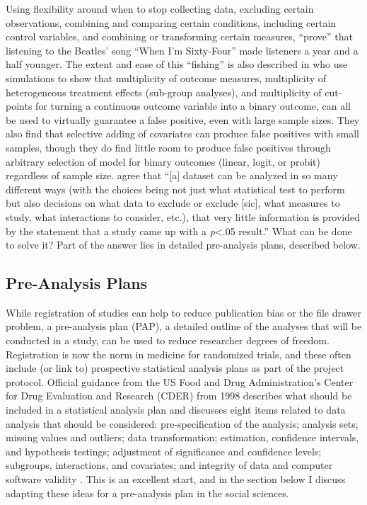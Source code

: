 \documentclass[12pt] {article}
\begin{document}
Using flexibility around when to stop
collecting data, excluding certain observations, combining and comparing
certain conditions, including certain control variables, and combining
or transforming certain measures, \cite{simmons_false-positive_2011} ``prove'' that listening to the
Beatles' song ``When I'm Sixty-Four'' made listeners a year and a half
younger. The extent and ease of this ``fishing'' is also described in
\cite{humphreys_fishing_2013} who use simulations to show that multiplicity of outcome measures, multiplicity of heterogeneous treatment effects (sub-group analyses), and multiplicity of cut-points for turning a continuous outcome variable into a binary outcome, can all be used to virtually guarantee a false positive, even with large sample sizes. They also find that selective adding of covariates can produce false positives with small samples, though they do find little room to produce false positives through arbitrary selection of model for binary outcomes (linear, logit, or probit) regardless of sample size. \cite{gelman_garden_2013} agree that
``{[}a{]} dataset can be analyzed in so many different ways (with the
choices being not just what statistical test to perform but also
decisions on what data to exclude or exclude {[}sic{]}, what measures to
study, what interactions to consider, etc.), that very little
information is provided by the statement that a study came up with a
\emph{p}\textless{}.05 result.''  What can be
done to solve it? Part of the answer lies in detailed
pre-analysis plans, described below.

\subsection{Pre-Analysis
Plans}\label{pre-analysis-plans}

While registration of studies can help to reduce publication bias or the file drawer problem, a pre-analysis plan (PAP), a detailed outline of the analyses that will be conducted in a study, can be used to reduce researcher degrees of freedom. Registration is now the norm in medicine for randomized trials, and these often include (or link to) prospective statistical analysis plans as part of the project protocol. Official guidance from the US Food and Drug Administration's Center for Drug Evaluation and Research (CDER) from 1998 describes what should be included in a statistical analysis plan and discusses eight items related to data analysis that should be considered: pre-specification of the analysis; analysis sets; missing values and outliers; data transformation; estimation, confidence intervals, and hypothesis testings; adjustment of significance and confidence levels; subgroups, interactions, and covariates; and integrity of data and computer software validity \citep{food1998guidance}.  This is an excellent start, and in the section below I discuss adapting these ideas for a pre-analysis plan in the social sciences.
\end{document}
